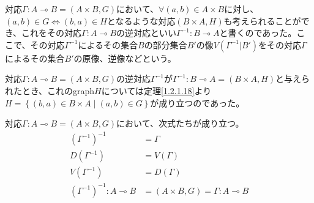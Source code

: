 \documentclass[a4paper]{jsarticle}
\begin{document}
対応$\varGamma:A \multimap B = (A \times B,G)$において、$\forall(a,b) \in A \times B$に対し、$(a,b) \in G \Leftrightarrow (b,a) \in H$となるような対応$(B \times A,H)$も考えられることができ、これをその対応$\varGamma:A \multimap B$の逆対応といい$\varGamma^{- 1}:B \multimap A$と書くのであった。ここで、その対応$\varGamma^{- 1}$によるその集合$B$の部分集合$B'$の像$V\left( \varGamma^{- 1}|B' \right)$をその対応$\varGamma$によるその集合$B'$の原像、逆像などという。\par
対応$\varGamma:A \multimap B = (A \times B,G)$の逆対応$\varGamma^{- 1}$が$\varGamma^{- 1}:B \multimap A = (B \times A,H)$と与えられたとき、これのgraph$H$については定理\ref{1.2.1.18}より$H = \left\{ (b,a) \in B \times A \middle| (a,b) \in G \right\}$が成り立つのであった。
\begin{thm}
\label{1.2.2.7}
対応$\varGamma:A \multimap B = (A \times B,G)$において、次式たちが成り立つ。
\begin{align*}
\left( \varGamma^{- 1} \right)^{- 1} &= \varGamma\\
D\left( \varGamma^{- 1} \right) &= V(\varGamma)\\
V\left( \varGamma^{- 1} \right) &= D(\varGamma)\\
\left( \varGamma^{- 1} \right)^{- 1}:A \multimap B &= (A \times B,G) = \varGamma:A \multimap B
\end{align*}
\end{thm}
\end{document}

